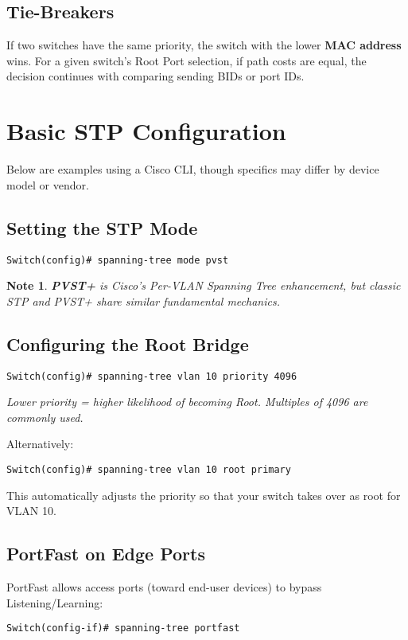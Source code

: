 \documentclass[a4paper]{report}
\newtheorem*{noteenv}{Note}
\begin{document}
\subsection{Tie-Breakers}
If two switches have the same priority, the switch with the lower \textbf{MAC address} wins. For a given switch’s Root Port selection, if path costs are equal, the decision continues with comparing sending BIDs or port IDs.

\section{Basic STP Configuration}
Below are examples using a Cisco CLI, though specifics may differ by device model or vendor.

\subsection{Setting the STP Mode}
\begin{lstlisting}
Switch(config)# spanning-tree mode pvst
\end{lstlisting}

\begin{noteenv}
\textbf{PVST+} is Cisco’s Per-VLAN Spanning Tree enhancement, but classic STP and PVST+ share similar fundamental mechanics.
\end{noteenv}

\subsection{Configuring the Root Bridge}
\begin{lstlisting}
Switch(config)# spanning-tree vlan 10 priority 4096
\end{lstlisting}

\textit{Lower priority = higher likelihood of becoming Root. Multiples of 4096 are commonly used.}

Alternatively:
\begin{lstlisting}
Switch(config)# spanning-tree vlan 10 root primary
\end{lstlisting}

This automatically adjusts the priority so that your switch takes over as root for VLAN 10.

\subsection{PortFast on Edge Ports}
PortFast allows access ports (toward end-user devices) to bypass Listening/Learning:
\begin{lstlisting}
Switch(config-if)# spanning-tree portfast
\end{lstlisting}
\end{document}

